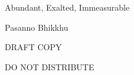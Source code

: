 \thispagestyle{empty}

\vspace*{1.75in}
{\center\LARGE

{\titlefont
Abundant, Exalted, Immeasurable

\vspace{.25in}\Large
Pasanno Bhikkhu
}


\mbox{}

DRAFT COPY

\mbox{}

DO NOT DISTRIBUTE

}

\clearpage
